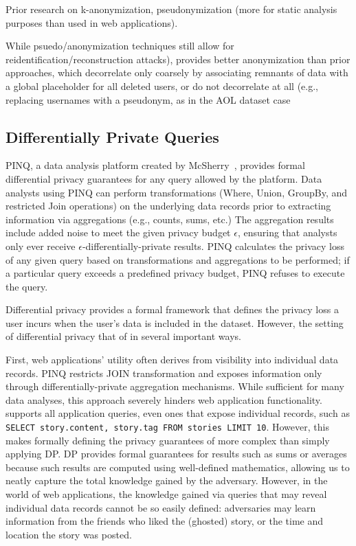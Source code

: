 Prior research on k-anonymization, pseudonymization (more for static analysis purposes than used in
web applications).

While psuedo/anonymization
techniques still allow for reidentification/reconstruction attacks), \sys{} provides better
anonymization than prior approaches, which decorrelate only coarsely by associating remnants of data
with a global placeholder for all deleted users, or do not decorrelate at all (e.g., replacing
usernames with a pseudonym, as in the AOL dataset case~%

\subsection{Differentially Private Queries}

PINQ, a data analysis platform created by McSherry~\cite{pinq}, provides formal differential privacy
guarantees for any query allowed by the platform.  Data analysts using PINQ can perform
transformations (Where, Union, GroupBy, and restricted Join operations) on the underlying data
records prior to extracting information via aggregations (e.g., counts, sums, etc.) The aggregation
results include added noise to meet the given privacy budget $\epsilon$, ensuring that analysts only
ever receive $\epsilon$-differentially-private results.  PINQ calculates the privacy loss of any
given query based on transformations and aggregations to be performed; if a particular query exceeds
a predefined privacy budget, PINQ refuses to execute the query.

Differential privacy provides a formal framework that defines the privacy loss a user incurs
when the user's data is included in the dataset. However, the setting of differential privacy
that of \sys{} in several important ways. 

First, web applications' utility often derives from visibility into individual data records. PINQ
restricts JOIN transformation and exposes information only through differentially-private
aggregation mechanisms. While sufficient for many data analyses, this approach severely hinders web
application functionality. \sys{} supports all application queries, even ones that expose individual
records, such as \texttt{SELECT story.content, story.tag FROM stories LIMIT 10}.  
However, this makes formally defining the privacy guarantees of \sys{} more complex than
simply applying DP.  DP provides formal guarantees for results such as sums or averages because such
results are computed using well-defined mathematics, allowing us to neatly capture the total
knowledge gained by the adversary. However, in the world of web applications, the knowledge gained
via queries that may reveal individual data records cannot be so easily defined: adversaries may
learn information from the friends who liked the (ghosted) story, or the time and location the story
was posted.

